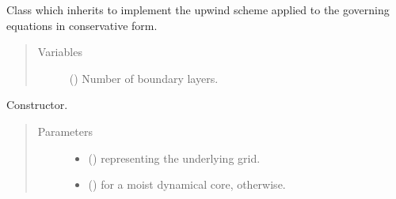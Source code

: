\documentclass[letterpaper,10pt,english]{sphinxmanual}
\begin{document}
\begin{fulllineitems}
\label{\detokenize{api:dycore.flux_isentropic.FluxIsentropicUpwind}}
Class which inherits {\hyperref[\detokenize{api:dycore.flux_isentropic.FluxIsentropic}]{}} to implement the upwind scheme applied to the governing equations
in conservative form.
\begin{quote}\begin{description}
\item[{Variables}] \leavevmode
{\hyperref[\detokenize{api:dycore.prognostic_isentropic.PrognosticIsentropic.nb}]{}} () \textendash{} Number of boundary layers.

\end{description}\end{quote}

\begin{fulllineitems}
\label{\detokenize{api:dycore.flux_isentropic.FluxIsentropicUpwind.__init__}}
Constructor.
\begin{quote}\begin{description}
\item[{Parameters}] \leavevmode\begin{itemize}
\item {} 
 () \textendash{} {\hyperref[\detokenize{api:grids.grid_xyz.GridXYZ}]{}} representing the underlying grid.

\item {} 
 () \textendash{}  for a moist dynamical core,  otherwise.

\end{itemize}

\end{description}\end{quote}

\end{fulllineitems}



\end{fulllineitems}
\end{document}
